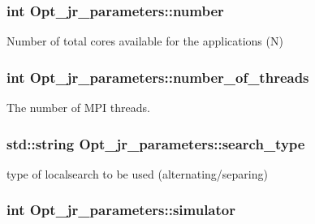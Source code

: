 \hypertarget{classOpt__jr__parameters_a3dfcb1783bcd6490733d10ced0833883}{
\subsubsection[{number}]{\setlength{\rightskip}{0pt plus 5cm}int Opt\-\_\-jr\-\_\-parameters\-::number\hspace{0.3cm}{\ttfamily [private]}}}\label{classOpt__jr__parameters_a3dfcb1783bcd6490733d10ced0833883}


Number of total cores available for the applications (N) 

\hypertarget{classOpt__jr__parameters_a90838c460af325a8a453ffb7fad21eaa}{
\subsubsection[{number\-\_\-of\-\_\-threads}]{\setlength{\rightskip}{0pt plus 5cm}int Opt\-\_\-jr\-\_\-parameters\-::number\-\_\-of\-\_\-threads\hspace{0.3cm}{\ttfamily [private]}}}\label{classOpt__jr__parameters_a90838c460af325a8a453ffb7fad21eaa}


The number of M\-P\-I threads. 

\hypertarget{classOpt__jr__parameters_a0826424385c08cba6aff3c04e6eee423}{
\subsubsection[{search\-\_\-type}]{\setlength{\rightskip}{0pt plus 5cm}std\-::string Opt\-\_\-jr\-\_\-parameters\-::search\-\_\-type\hspace{0.3cm}{\ttfamily [private]}}}\label{classOpt__jr__parameters_a0826424385c08cba6aff3c04e6eee423}


type of localsearch to be used (alternating/separing) 

\hypertarget{classOpt__jr__parameters_a032e1532dc68ecb39b2f2129c0d81449}{
\subsubsection[{simulator}]{\setlength{\rightskip}{0pt plus 5cm}int Opt\-\_\-jr\-\_\-parameters\-::simulator\hspace{0.3cm}{\ttfamily [private]}}}\label{classOpt__jr__parameters_a032e1532dc68ecb39b2f2129c0d81449}


